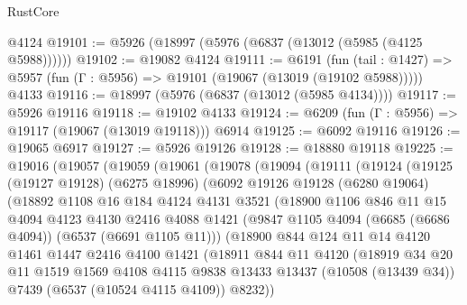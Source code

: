\begin{lexlean}{RustCore}
\begin{coremodule}
    @4124
@19101 := @5926 (@18997 (@5976 (@6837 (@13012 (@5985 (@4125 @5988))))))
@19102 := @19082 @4124
@19111 := @6191
    (fun (tail : @1427) => @5957 (fun (Γ : @5956) => @19101 (@19067 (@13019 (@19102 @5988)))))
    @4133
@19116 := @18997 (@5976 (@6837 (@13012 (@5985 @4134))))
@19117 := @5926 @19116
@19118 := @19102 @4133
@19124 := @6209 (fun (Γ : @5956) => @19117 (@19067 (@13019 @19118))) @6914
@19125 := @6092 @19116
@19126 := @19065 @6917
@19127 := @5926 @19126
@19128 := @18880 @19118
@19225 := @19016
    (@19057
      (@19059
        (@19061
          (@19078
            (@19094
              (@19111
                (@19124
                  (@19125
                    (@19127 @19128)
                    (@6275 @18996)
                    (@6092
                      @19126
                      @19128
                      (@6280 @19064)
                      (@18892
                        @1108
                        @16
                        @184
                        @4124
                        @4131
                        @3521
                        (@18900
                          @1106
                          @846
                          @11
                          @15
                          @4094
                          @4123
                          @4130
                          @2416
                          @4088
                          @1421
                          (@9847 @1105 @4094 (@6685 (@6686 @4094)) (@6537 (@6691 @1105 @11)))
                          (@18900
                            @844
                            @124
                            @11
                            @14
                            @4120
                            @1461
                            @1447
                            @2416
                            @4100
                            @1421
                            (@18911
                              @844
                              @11
                              @4120
                              (@18919
                                @34
                                @20
                                @11
                                @1519
                                @1569
                                @4108
                                @4115
                                @9838
                                @13433
                                @13437
                                (@10508 (@13439 @34))
                                @7439
                                (@6537 (@10524 @4115 @4109))
                                @8232))

\end{coremodule}
\end{lexlean}
